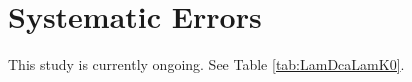 \documentclass[../AnalysisNoteJBuxton.tex]{subfiles}
\begin{document}
\section{Systematic Errors}
\label{SystematicErrors}

This study is currently ongoing.  See Table \ref{tab:LamDcaLamK0}.



\end{document}
